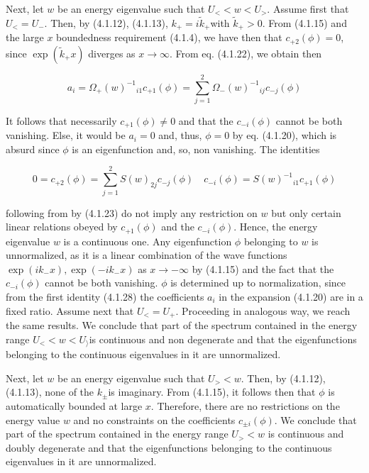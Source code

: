 \documentclass{article}
\begin{document}
Next, let $w$ be an energy eigenvalue such that $U_{<}<w<U_{>}$. Assume first that $U_{<}=U_{-}$. Then, by (4.1.12), (4.1.13), $k_{+}=i \tilde{k}_{+}$with $\tilde{k}_{+}>0$. From (4.1.15) and the large $x$ boundedness requirement (4.1.4), we have then that $c_{+2}(\phi)=0$, since $\exp \left(\tilde{k}_{+} x\right)$ diverges as $x \rightarrow \infty$. From eq. (4.1.22), we obtain then
 
\begin{equation*}
a_{i}=\Omega_{+}(w)^{-1}{ }_{i 1} c_{+1}(\phi)=\sum_{j=1}^{2} \Omega_{-}(w)^{-1}{ }_{i j} c_{-j}(\phi) \tag{4.1.28}
\end{equation*}
 

It follows that necessarily $c_{+1}(\phi) \neq 0$ and that the $c_{-i}(\phi)$ cannot be both vanishing. Else, it would be $a_{i}=0$ and, thus, $\phi=0$ by eq. (4.1.20), which is absurd since $\phi$ is an eigenfunction and, so, non vanishing. The identities
 
\begin{equation*}
0=c_{+2}(\phi)=\sum_{j=1}^{2} S(w)_{2 j} c_{-j}(\phi) \quad c_{-i}(\phi)=S(w)^{-1}{ }_{i 1} c_{+1}(\phi) \tag{4.1.29}
\end{equation*}
 
following from by (4.1.23) do not imply any restriction on $w$ but only certain linear relations obeyed by $c_{+1}(\phi)$ and the $c_{-i}(\phi)$. Hence, the energy eigenvalue $w$ is a continuous one. Any eigenfunction $\phi$ belonging to $w$ is unnormalized, as it is a linear combination of the wave functions $\exp \left(i k_{-} x\right), \exp \left(-i k_{-} x\right)$ as $x \rightarrow-\infty$ by (4.1.15) and the fact that the $c_{-i}(\phi)$ cannot be both vanishing. $\phi$ is determined up to normalization, since from the first identity (4.1.28) the coefficients $a_{i}$ in the expansion (4.1.20) are in a fixed ratio. Assume next that $U_{<}=U_{+}$. Proceeding in analogous way, we reach the same results. We conclude that part of the spectrum contained in the energy range $U_{<}<w<U_{\rangle}$is continuous and non degenerate and that the eigenfunctions belonging to the continuous eigenvalues in it are unnormalized.

Next, let $w$ be an energy eigenvalue such that $U_{>}<w$. Then, by (4.1.12), (4.1.13), none of the $k_{ \pm}$is imaginary. From (4.1.15), it follows then that $\phi$ is automatically bounded at large $x$. Therefore, there are no restrictions on the energy value $w$ and no constraints on the coefficients $c_{ \pm i}(\phi)$. We conclude that part of the spectrum contained in the energy range $U_{>}<w$ is continuous and doubly degenerate and that the eigenfunctions belonging to the continuous eigenvalues in it are unnormalized.
\end{document}
